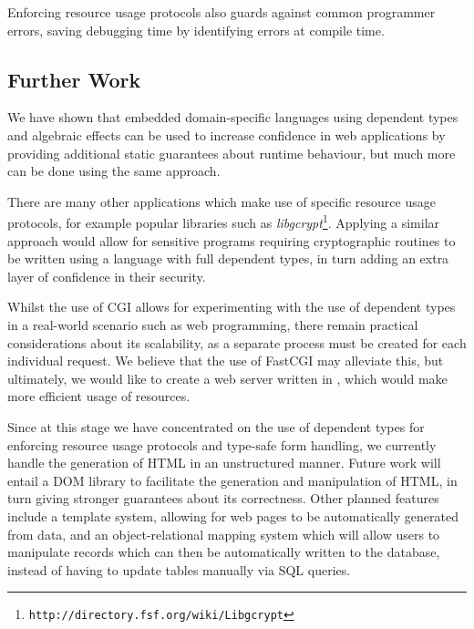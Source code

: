 Enforcing resource usage protocols also guards against common programmer errors, saving debugging time by identifying errors at compile time.
\subsection{Further Work}
We have shown that embedded domain-specific languages using dependent types and algebraic effects can be used to increase confidence in web applications by providing additional static guarantees about runtime behaviour, but much more can be done using the same approach.

There are many other applications which make use of specific resource usage protocols, for example popular libraries such as \textit{libgcrypt}\footnote{\texttt{http://directory.fsf.org/wiki/Libgcrypt}}. Applying a similar approach would allow for sensitive programs requiring cryptographic routines to be written using a language with full dependent types, in turn adding an extra layer of confidence in their security. 

Whilst the use of CGI allows for experimenting with the use of dependent types in a real-world scenario such as web programming, there remain practical considerations about its scalability, as a separate process must be created for each individual request. We believe that the use of FastCGI may alleviate this, but ultimately, we would like to create a web server written in \idris{}, which would make more efficient usage of resources. 

Since at this stage we have concentrated on the use of dependent types for enforcing resource usage protocols and type-safe form handling, we currently handle the generation of HTML in an unstructured manner. Future work will entail a DOM library to facilitate the generation and manipulation of HTML, in turn giving stronger guarantees about its correctness. Other planned features include a template system, allowing for web pages to be automatically generated from data, and an object-relational mapping system which will allow users to manipulate records which can then be automatically written to the database, instead of having to update tables manually via SQL queries.


